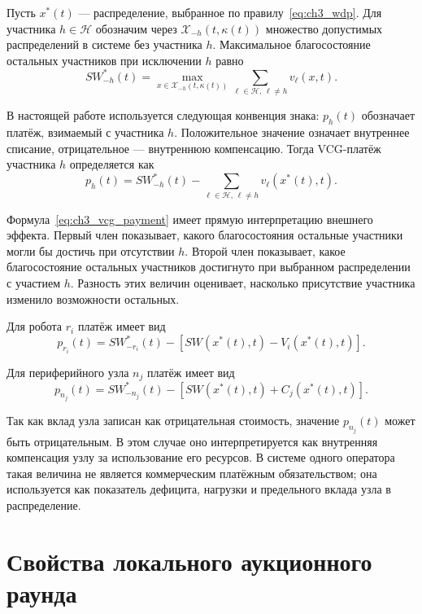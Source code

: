 Пусть $x^*(t)$ --- распределение, выбранное по правилу~\eqref{eq:ch3_wdp}. Для участника $h\in\mathcal{H}$ обозначим через $\mathcal{X}_{-h}(t,\kappa(t))$ множество допустимых распределений в системе без участника $h$. Максимальное благосостояние остальных участников при исключении $h$ равно
\begin{equation}
SW^*_{-h}(t)=
\max_{x\in\mathcal{X}_{-h}(t,\kappa(t))}
\sum_{\ell\in\mathcal{H},\,\ell\neq h}v_{\ell}(x,t).
\label{eq:ch3_without_h}
\end{equation}

В настоящей работе используется следующая конвенция знака: $p_h(t)$ обозначает платёж, взимаемый с участника $h$. Положительное значение означает внутреннее списание, отрицательное --- внутреннюю компенсацию. Тогда VCG-платёж участника $h$ определяется как
\begin{equation}
p_h(t)=SW^*_{-h}(t)-
\sum_{\ell\in\mathcal{H},\,\ell\neq h}v_{\ell}(x^*(t),t).
\label{eq:ch3_vcg_payment}
\end{equation}

Формула~\eqref{eq:ch3_vcg_payment} имеет прямую интерпретацию внешнего эффекта. Первый член показывает, какого благосостояния остальные участники могли бы достичь при отсутствии $h$. Второй член показывает, какое благосостояние остальных участников достигнуто при выбранном распределении с участием $h$. Разность этих величин оценивает, насколько присутствие участника изменило возможности остальных.

Для робота $r_i$ платёж имеет вид
\begin{equation}
p_{r_i}(t)=SW^*_{-r_i}(t)-
\left[SW(x^*(t),t)-V_i(x^*(t),t)\right].
\label{eq:ch3_robot_payment}
\end{equation}

Для периферийного узла $n_j$ платёж имеет вид
\begin{equation}
p_{n_j}(t)=SW^*_{-n_j}(t)-
\left[SW(x^*(t),t)+C_j(x^*(t),t)\right].
\label{eq:ch3_node_payment}
\end{equation}

Так как вклад узла записан как отрицательная стоимость, значение $p_{n_j}(t)$ может быть отрицательным. В этом случае оно интерпретируется как внутренняя компенсация узлу за использование его ресурсов. В системе одного оператора такая величина не является коммерческим платёжным обязательством; она используется как показатель дефицита, нагрузки и предельного вклада узла в распределение.

\section{Свойства локального аукционного раунда}

